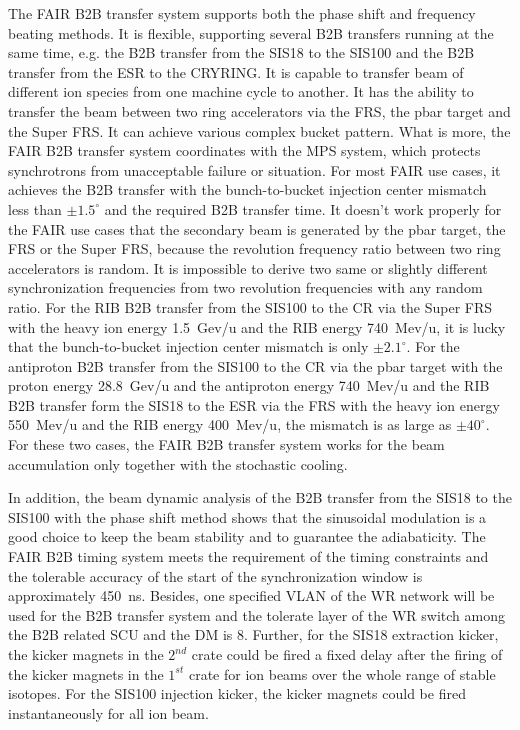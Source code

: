The FAIR B2B transfer system supports both the phase shift and frequency beating methods. It is flexible, supporting several B2B transfers running at the same time, e.g. the B2B transfer from the SIS18 to the SIS100 and the B2B transfer from the ESR to the CRYRING. It is capable to transfer beam of different ion species from one machine cycle to another. It has the ability to transfer the beam between two ring accelerators via the FRS, the pbar target and the Super FRS. It can achieve various complex bucket pattern. What is more, the FAIR B2B transfer system coordinates with the MPS system, which protects synchrotrons from unacceptable failure or situation. For most FAIR use cases, it achieves the B2B transfer with the bunch-to-bucket injection center mismatch less than $\pm1.5^\circ$ and the required B2B transfer time. It doesn't work properly for the FAIR use cases that the secondary beam is generated by the pbar target, the FRS or the Super FRS, because the revolution frequency ratio between two ring accelerators is random. It is impossible to derive two same or slightly different synchronization frequencies from two revolution frequencies with any random ratio. For the RIB B2B transfer from the SIS100 to the CR via the Super FRS with the heavy ion energy \SI{1.5}{Gev/u} and the RIB energy \SI{740}{Mev/u}, it is lucky that the bunch-to-bucket injection center mismatch is only $\pm2.1^\circ$. For the antiproton B2B transfer from the SIS100 to the CR via the pbar target with the proton energy \SI{28.8}{Gev/u} and the antiproton energy \SI{740}{Mev/u} and the RIB B2B transfer form the SIS18 to the ESR via the FRS with the heavy ion energy \SI{550}{Mev/u} and the RIB energy \SI{400}{Mev/u}, the mismatch is as large as $\pm40^\circ$. For these two cases, the FAIR B2B transfer system works for the beam accumulation only together with the stochastic cooling.  

In addition, the beam dynamic analysis of the B2B transfer from the SIS18 to the SIS100 with the phase shift method shows that the sinusoidal modulation is a good choice to keep the beam stability and to guarantee the adiabaticity. The FAIR B2B timing system meets the requirement of the timing constraints and the tolerable accuracy of the start of the synchronization window is approximately \SI{450}{\ns}. Besides, one specified VLAN of the WR network will be used for the B2B transfer system and the tolerate layer of the WR switch among the B2B related SCU and the DM is 8.  Further, for the SIS18 extraction kicker, the kicker magnets in the $2^{nd}$ crate could be fired a fixed delay after the firing of the kicker magnets in the $1^{st}$ crate for ion beams over the whole range of stable isotopes. For the SIS100 injection kicker, the kicker magnets could be fired instantaneously for all ion beam. 

